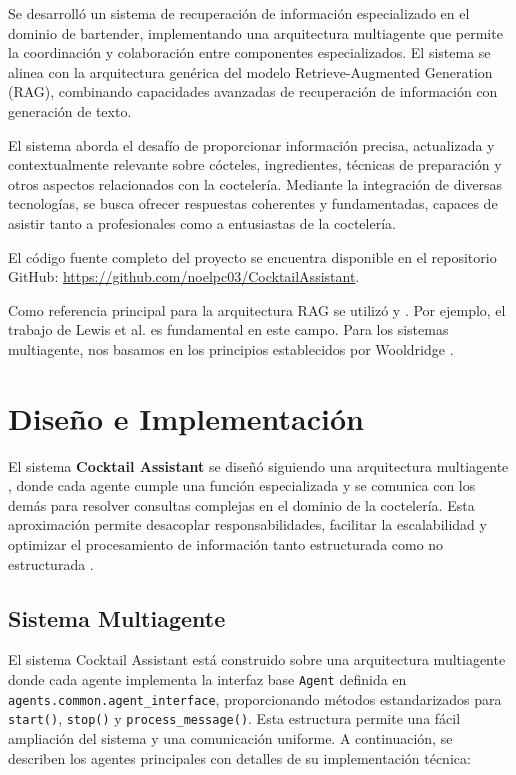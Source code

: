 \documentclass[runningheads]{llncs}
\begin{document}
Se desarrolló un sistema de recuperación de información especializado en el dominio de bartender, implementando una arquitectura multiagente que permite la coordinación y colaboración entre componentes especializados. El sistema se alinea con la arquitectura genérica del modelo Retrieve-Augmented Generation (RAG), combinando capacidades avanzadas de recuperación de información con generación de texto.

El sistema aborda el desafío de proporcionar información precisa, actualizada y contextualmente relevante sobre cócteles, ingredientes, técnicas de preparación y otros aspectos relacionados con la coctelería. Mediante la integración de diversas tecnologías, se busca ofrecer respuestas coherentes y fundamentadas, capaces de asistir tanto a profesionales como a entusiastas de la coctelería.

El código fuente completo del proyecto se encuentra disponible en el repositorio GitHub: \url{https://github.com/noelpc03/CocktailAssistant}.

Como referencia principal para la arquitectura RAG se utilizó \cite{rag_simple} y \cite{lewis2020retrieval}.
Por ejemplo, el trabajo de Lewis et al. \cite{lewis2020retrieval} es fundamental en este campo. Para los sistemas multiagente, nos basamos en los principios establecidos por Wooldridge \cite{multiagent_simple}.

\section{Diseño e Implementación}

El sistema \textbf{Cocktail Assistant} se diseñó siguiendo una arquitectura multiagente \cite{multiagent_simple}, donde cada agente cumple una función especializada y se comunica con los demás para resolver consultas complejas en el dominio de la coctelería. Esta aproximación permite desacoplar responsabilidades, facilitar la escalabilidad y optimizar el procesamiento de información tanto estructurada como no estructurada \cite{information_retrieval}.

\subsection{Sistema Multiagente}

El sistema Cocktail Assistant está construido sobre una arquitectura multiagente donde cada agente implementa la interfaz base \texttt{Agent} definida en \\ \texttt{agents.common.agent\_interface}, proporcionando métodos estandarizados para \texttt{start()}, \texttt{stop()} y \texttt{process\_message()}. Esta estructura permite una fácil ampliación del sistema y una comunicación uniforme. A continuación, se describen los agentes principales con detalles de su implementación técnica:
\end{document}
